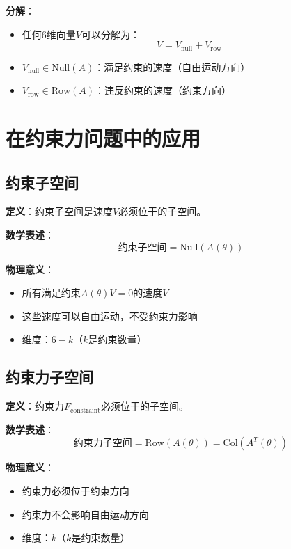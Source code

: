 \documentclass[12pt,a4paper]{article}
\begin{document}
\textbf{分解}：
\begin{itemize}
\item 任何6维向量$V$可以分解为：
\begin{equation}
V = V_{\text{null}} + V_{\text{row}}
\end{equation}
\item $V_{\text{null}} \in \text{Null}(A)$：满足约束的速度（自由运动方向）
\item $V_{\text{row}} \in \text{Row}(A)$：违反约束的速度（约束方向）
\end{itemize}

\section{在约束力问题中的应用}

\subsection{约束子空间}

\textbf{定义}：约束子空间是速度$V$必须位于的子空间。

\textbf{数学表述}：
\begin{equation}
\text{约束子空间} = \text{Null}(A(\theta))
\end{equation}

\textbf{物理意义}：
\begin{itemize}
\item 所有满足约束$A(\theta)V = 0$的速度$V$
\item 这些速度可以自由运动，不受约束力影响
\item 维度：$6 - k$（$k$是约束数量）
\end{itemize}

\subsection{约束力子空间}

\textbf{定义}：约束力$F_{\text{constraint}}$必须位于的子空间。

\textbf{数学表述}：
\begin{equation}
\text{约束力子空间} = \text{Row}(A(\theta)) = \text{Col}(A^T(\theta))
\end{equation}

\textbf{物理意义}：
\begin{itemize}
\item 约束力必须位于约束方向
\item 约束力不会影响自由运动方向
\item 维度：$k$（$k$是约束数量）
\end{itemize}
\end{document}
